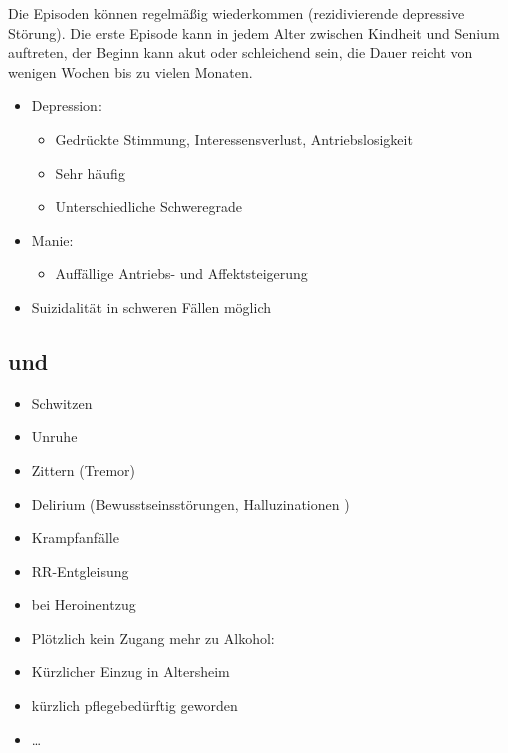 {Die Episoden können regelmäßig wiederkommen (rezidivierende
depressive Störung). Die erste Episode kann in jedem Alter
zwischen Kindheit und Senium auftreten, der Beginn kann akut
oder schleichend sein, die Dauer reicht von wenigen Wochen
bis zu vielen Monaten.
\cite{ICD10De}
}{%
\begin{itemize}
  \item Depression:
  \begin{itemize}
    \item Gedrückte Stimmung, Interessensverlust, Antriebslosigkeit
    \item Sehr häufig
    \item Unterschiedliche Schweregrade
  \end{itemize}
  \item Manie:
  \begin{itemize}
    \item Auffällige Antriebs- und Affektsteigerung
  \end{itemize}
  \item Suizidalität in schweren Fällen möglich
\end{itemize}
}







\subsection{ und 
}



\Text{\TxSymptome}
{%
\label{topic:alkohol-entzug}%
\begin{itemize}
  \item Schwitzen
  \item Unruhe
  \item Zittern (Tremor)
  \item Delirium  (Bewusstseinsstörungen, Halluzinationen )
  \item Krampfanfälle
  \item RR-Entgleisung
  \item {} bei Heroinentzug
\end{itemize}
}{

}{}{}{}

{
\begin{itemize}
  \item Plötzlich kein Zugang mehr zu Alkohol:
  \item Kürzlicher Einzug in Altersheim
  \item kürzlich pflegebedürftig geworden
  \item \ldots
\end{itemize}
}{}{}{}{}





